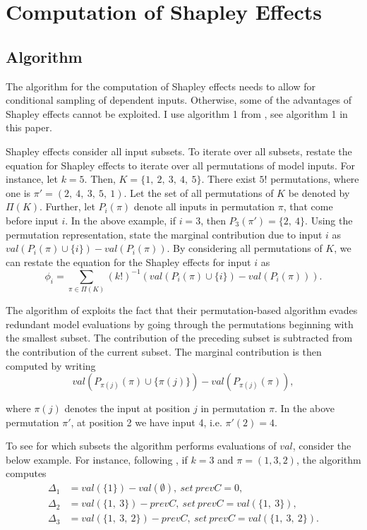 \section{Computation of Shapley Effects} \label{comp_shap}

\subsection{Algorithm}

The algorithm for the computation of Shapley effects needs to allow for conditional sampling of dependent inputs. Otherwise, some of the advantages of Shapley effects cannot be exploited. I use algorithm 1 from \citet{SNS16}, see algorithm 1 in this paper.

Shapley effects consider all input subsets. To iterate over all subsets, \citet{SNS16} restate the equation for Shapley effects to iterate over all permutations of model inputs. For instance, let $k=5$. Then, $K=\{1,\ 2,\ 3,\ 4,\ 5\}$. There exist $5!$ permutations, where one is $\pi'=(2,\ 4,\ 3,\ 5,\ 1)$. Let the set of all permutations of $K$ be denoted by $\Pi(K)$. Further, let $P_i(\pi)$ denote all inputs in permutation $\pi$, that come before input $i$. In the above example, if $i=3$, then $P_3(\pi')=\{2,\ 4\}$. Using the permutation representation, \citet{SNS16} state the marginal contribution due to input $i$ as $val(P_i(\pi) \cup\{i\}) - val(P_i(\pi))$. By considering all permutations of $K$, we can restate the equation for the Shapley effects for input $i$ as
\begin{equation}
\phi_i=\sum_{\pi \in \Pi(K)} (k!)^{-1} (val(P_i(\pi) \cup\{i\}) - val(P_i(\pi))).
\end{equation}

The algorithm of \citet{SNS16} exploits the fact that their permutation-based algorithm evades redundant model evaluations by going through the permutations beginning with the smallest subset. The contribution of the preceding subset is subtracted from the contribution of the current subset. The marginal contribution is then computed by writing
\begin{equation}
val(P_{\pi(j)}(\pi) \cup \{\pi(j)\}) - val(P_{\pi(j)}(\pi)),
\end{equation}

\noindent where $\pi(j)$ denotes the input at position $j$ in permutation $\pi$. In the above permutation $\pi'$, at position 2 we have input 4, i.e. $\pi'(2)=4$.

To see for which subsets the algorithm performs evaluations of $val$, consider the below example. For instance, following \citet{SNS16}, if $k=3$ and $\pi=(1, 3, 2)$, the algorithm computes
\begin{align*}
\Delta_1 &=val(\{1\})-val(\emptyset),\ set\ prevC=0, \\
\Delta_2 &=val(\{1,\ 3\})-prevC,\ set\ prevC=val(\{1,\ 3\}), \\
\Delta_3 &=val(\{1,\ 3,\ 2\})-prevC,\ set\ prevC=val(\{1,\ 3,\ 2\}).
\end{align*}

